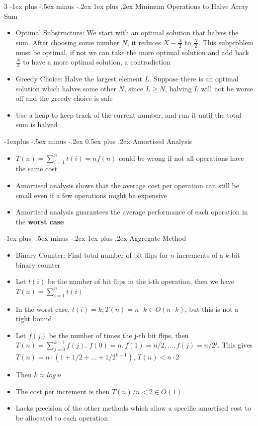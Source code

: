 \documentclass[10pt, landscape]{article}
\makeatletter
\renewcommand{\section}{\@startsection{section}{1}{0mm}%
                                {-1ex plus -.5ex minus -.2ex}%
                                {0.5ex plus .2ex}%
                                {\normalfont\large\bfseries}}
\renewcommand{\section}{\@startsection{section}{2}{0mm}%
                                {-1explus -.5ex minus -.2ex}%
                                {0.5ex plus .2ex}%
                                {\normalfont\normalsize\bfseries}}
\renewcommand{\subsection}{\@startsection{subsection}{3}{0mm}%
                                {-1ex plus -.5ex minus -.2ex}%
                                {1ex plus .2ex}%
                                {\normalfont\small\bfseries}}%
\makeatother
\begin{document}
\begin{multicols*}{3}
\subsection{Minimum Operations to Halve Array Sum}
\begin{itemize}
    \item Optimal Substructure: We start with an optimal solution that halves the sum. After choosing some number $N$, it reduces $X-\frac{N}{2}$ to $\frac{X}{2}$. This subproblem must be optimal, if not we can take the more optimal solution and add back $\frac{N}{2}$ to have a more optimal solution, a contradiction
    \item Greedy Choice: Halve the largest element $L$. Suppose there is an optimal solution which halves some other $N$, since $L \geq N$, halving $L$ will not be worse off and the greedy choice is safe
    \item Use a heap to keep track of the current number, and run it until the total sum is halved
\end{itemize}

\section{Amortised Analysis}
\begin{itemize}
    \item $T(n)=\sum_{i=1}^nt(i)=nf(n)$ could be wrong if not all operations have the same cost
    \item Amortised analysis shows that the average cost per operation can still be small even if a few operations might be expensive
    \item Amortised analysis guarantees the average performance of each operation in the \textbf{worst case}
\end{itemize}

\subsection{Aggregate Method}
\begin{itemize}
    \item Binary Counter: Find total number of bit flips for $n$ increments of a $k$-bit binary counter
    \item Let $t(i)$ be the number of bit flips in the i-th operation, then we have $T(n)=\sum_{i=1}^nt(i)$
    \item In the worst case, $t(i)=k, T(n)=n\cdot k \in O(n \cdot k)$, but this is not a tight bound
    \item Let $f(j)$ be the number of times the j-th bit flips, then $T(n)=\sum_{j=0}^{k-1}f(j)$. $f(0)=n, f(1)=n/2,..., f(j)=n/2^j$. This gives $T(n)=n\cdot (1+1/2+...+1/2^{k-1})$, $T(n) < n \cdot 2$
    \item Then $k \approx log\ n$
    \item The cost per increment is then $T(n)/n < 2 \in O(1)$
    \item Lacks precision of the other methods which allow a specific amortised cost to be allocated to each operation
\end{itemize}


\end{multicols*}
\end{document}
